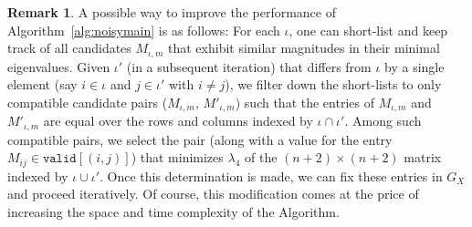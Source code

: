 \documentclass{article}
\theoremstyle{definition}
\newtheorem{Remark}{Remark}
\renewcommand{\|}{|}
\newcommand{\valid}{\texttt{valid}}
\begin{document}
\begin{Remark}
A possible way to improve the performance of Algorithm~\ref{alg:noisymain} is as follows: For each $\iota$, one can short-list and keep track of all candidates $M_{\iota, m}$ that exhibit similar magnitudes in their minimal eigenvalues. Given $\iota'$ (in a subsequent iteration) that differs from $\iota$ by a single element (say $i \in \iota$ and $j \in \iota'$ with $i \neq j$), we filter down the short-lists to only compatible candidate pairs ($M_{\iota,m}$, $M'_{\iota, m}$) such that the entries of $M_{\iota,m}$ and $M'_{\iota, m}$ are equal over the rows and columns indexed by $\iota \cap \iota'$. Among such compatible pairs, we select the pair (along with a value for the entry $M_{ij} \in \valid[(i,j)]$) that minimizes $\lambda_4$ of the $(n+2)\times (n+2)$ matrix indexed by $\iota \cup \iota'$. Once this determination is made, we can fix these entries in $G_X$ and proceed iteratively. Of course, this modification comes at the price of increasing the space and time complexity of the Algorithm.
\end{Remark}
\end{document}

